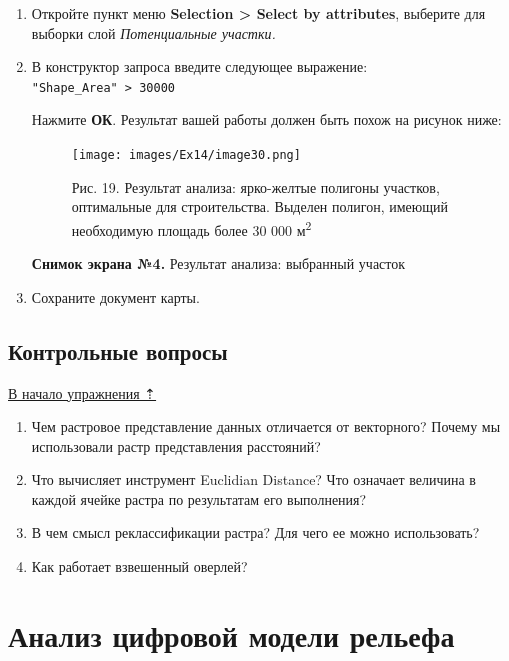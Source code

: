 \documentclass[12pt,]{book}
\begin{document}
\begin{enumerate}
\def\labelenumi{\arabic{enumi}.}
\item
  Откройте пункт меню \textbf{Selection \textgreater{} Select by attributes}, выберите для выборки слой \emph{Потенциальные участки.}
\item
  В конструктор запроса введите следующее выражение:
  \texttt{"Shape\_Area"\ \textgreater{}\ 30000}

  Нажмите \textbf{ОК}. Результат вашей работы должен быть похож на рисунок ниже:

  \begin{figure}
  \centering
  \texttt{[image: images/Ex14/image30.png]}
  \caption{Рис. 19. Результат анализа: ярко-желтые полигоны участков, оптимальные для строительства. Выделен полигон, имеющий необходимую площадь более 30 000 м\textsuperscript{2}}
  \end{figure}

  \textbf{Снимок экрана №4.} Результат анализа: выбранный участок
\item
  Сохраните документ карты.
\end{enumerate}

\hypertarget{weighted-overlay-questions}{%
\section{Контрольные вопросы}\label{weighted-overlay-questions}}

\protect\hyperlink{weighted-overlay}{В начало упражнения ⇡}

\begin{enumerate}
\def\labelenumi{\arabic{enumi}.}
\item
  Чем растровое представление данных отличается от векторного? Почему мы использовали растр представления расстояний?
\item
  Что вычисляет инструмент Euclidian Distance? Что означает величина в каждой ячейке растра по результатам его выполнения?
\item
  В чем смысл реклассификации растра? Для чего ее можно использовать?
\item
  Как работает взвешенный оверлей?
\end{enumerate}

\hypertarget{dem}{%
\chapter{Анализ цифровой модели рельефа}\label{dem}}
\end{document}
